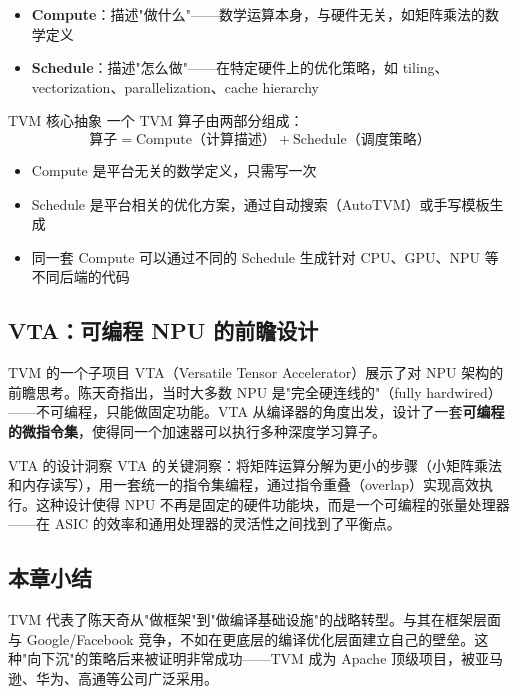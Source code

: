 \documentclass[a4paper]{article}
\begin{document}
\begin{itemize}
\item \textbf{Compute}：描述"做什么"——数学运算本身，与硬件无关，如矩阵乘法的数学定义
\item \textbf{Schedule}：描述"怎么做"——在特定硬件上的优化策略，如 tiling、vectorization、parallelization、cache hierarchy
\end{itemize}

\begin{importantbox}{TVM 核心抽象}
一个 TVM 算子由两部分组成：
$$
\text{算子} = \text{Compute（计算描述）} + \text{Schedule（调度策略）}
$$
\begin{itemize}
\item Compute 是平台无关的数学定义，只需写一次
\item Schedule 是平台相关的优化方案，通过自动搜索（AutoTVM）或手写模板生成
\item 同一套 Compute 可以通过不同的 Schedule 生成针对 CPU、GPU、NPU 等不同后端的代码
\end{itemize}
\end{importantbox}

\subsection{VTA：可编程 NPU 的前瞻设计}

TVM 的一个子项目 VTA（Versatile Tensor Accelerator）展示了对 NPU 架构的前瞻思考。陈天奇指出，当时大多数 NPU 是"完全硬连线的"（fully hardwired）——不可编程，只能做固定功能。VTA 从编译器的角度出发，设计了一套\textbf{可编程的微指令集}，使得同一个加速器可以执行多种深度学习算子。

\begin{knowledgebox}{VTA 的设计洞察}
VTA 的关键洞察：将矩阵运算分解为更小的步骤（小矩阵乘法和内存读写），用一套统一的指令集编程，通过指令重叠（overlap）实现高效执行。这种设计使得 NPU 不再是固定的硬件功能块，而是一个可编程的张量处理器——在 ASIC 的效率和通用处理器的灵活性之间找到了平衡点。
\end{knowledgebox}

\subsection{本章小结}

TVM 代表了陈天奇从"做框架"到"做编译基础设施"的战略转型。与其在框架层面与 Google/Facebook 竞争，不如在更底层的编译优化层面建立自己的壁垒。这种"向下沉"的策略后来被证明非常成功——TVM 成为 Apache 顶级项目，被亚马逊、华为、高通等公司广泛采用。
\end{document}
